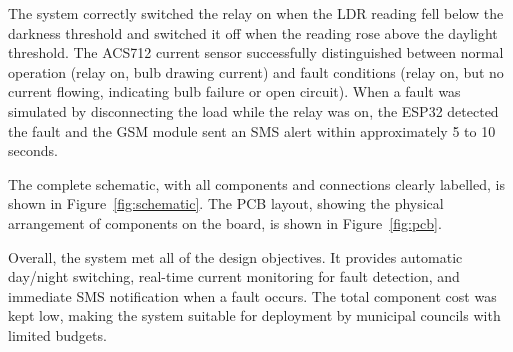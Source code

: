 The system correctly switched the relay on when the LDR reading fell below the darkness threshold and switched it off when the reading rose above the daylight threshold. The ACS712 current sensor successfully distinguished between normal operation (relay on, bulb drawing current) and fault conditions (relay on, but no current flowing, indicating bulb failure or open circuit). When a fault was simulated by disconnecting the load while the relay was on, the ESP32 detected the fault and the GSM module sent an SMS alert within approximately 5 to 10 seconds.

The complete schematic, with all components and connections clearly labelled, is shown in Figure~\ref{fig:schematic}. The PCB layout, showing the physical arrangement of components on the board, is shown in Figure~\ref{fig:pcb}.

Overall, the system met all of the design objectives. It provides automatic day/night switching, real-time current monitoring for fault detection, and immediate SMS notification when a fault occurs. The total component cost was kept low, making the system suitable for deployment by municipal councils with limited budgets.
